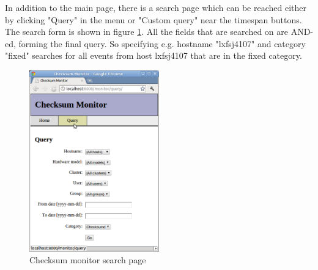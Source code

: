 In addition to the main page, there is a search page which can be reached either by clicking "Query" in the menu or "Custom query" near the timespan buttons. The search form is shown in figure \ref{fig:monitor-search}. All the fields that are searched on are AND-ed, forming the final query. So specifying e.g. hostname "lxfsj4107" and category "fixed" searches for all events from host lxfsj4107 that are in the fixed category.

\begin{figure}[ht]
\centering
\includegraphics[width=0.5\textwidth]{gfx/checksum-monitor-search}
\caption{Checksum monitor search page}
\label{fig:monitor-search}
\end{figure}

